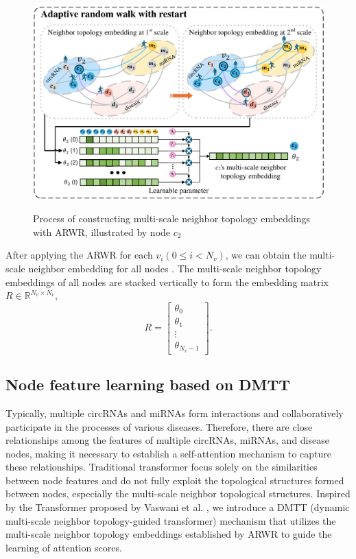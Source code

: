 \documentclass[journal=jcisd8,manuscript=article]{achemso}
\begin{document}
\begin{figure}
    \centering
    \includegraphics[width=5in]{fig/visio3.pdf}\\       
	\caption{Process of constructing multi-scale neighbor topology embeddings with ARWR, illustrated by node $c_{2}$}
    \label{fig:visio3}
\end{figure}

After applying the ARWR for each $v_i(0 \leqslant i < N_v)$, we can obtain the multi-scale neighbor embedding for all nodes . The multi-scale neighbor topology embeddings of all nodes are stacked vertically to form the embedding matrix $R \in \mathbb{R}^{N_v \times N_v}$,
\begin{equation}
	R = \left[\begin{array}{cccc}
		\theta _0\\
		\theta _1\\
		\vdots\\
		\theta _{N_v-1}
	\end{array}\right].
\end{equation}

\vspace{-0.5cm}

\subsection{Node feature learning based on DMTT}
\vspace{-0.3cm}
Typically, multiple circRNAs and miRNAs form interactions and collaboratively participate in the processes of various diseases. Therefore, there are close relationships among the features of multiple circRNAs, miRNAs, and disease nodes, making it necessary to establish a self-attention mechanism to capture these relationships. Traditional transformer focus solely on the similarities between node features and do not fully exploit the topological structures formed between nodes, especially the multi-scale neighbor topological structures. Inspired by the Transformer proposed by Vaswani et al. \cite{vaswani2017attention}, we introduce a DMTT (dynamic multi-scale neighbor topology-guided transformer) mechanism that utilizes the multi-scale neighbor topology embeddings established by ARWR to guide the learning of attention scores.
\end{document}
